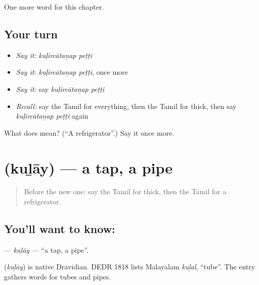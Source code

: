 \begin{grammarlens}[title={What you've built}]
One more word for this chapter.
\end{grammarlens}

\subsection*{Your turn}
\begin{itemize}
\raggedright
  \item \emph{Say it:} \emph{kuḷircātaṉap peṭṭi}
  \item \emph{Say it:} \emph{kuḷircātaṉap peṭṭi}, once more
  \item \emph{Say it:} say \emph{kuḷircātaṉap peṭṭi}
  \item \emph{Recall:} say the Tamil for everything, then the Tamil for thick, then say \emph{kuḷircātaṉap peṭṭi} again
\end{itemize}

\begin{tcolorbox}[breakable,colback=teal!4,colframe=teal!35!black,title={Before you move on}]
What does   mean? (\textquotedblleft{}A refrigerator\textquotedblright{}.) Say it once more.
\end{tcolorbox}
\section[\texorpdfstring{\ta{குழாய்} (kuḻāy)}{குழாய் (kuḻāy)}]{ (kuḻāy) — a tap, a pipe}

\label{lesson:TA-C182-kulay}



\begin{quote}
Before the new one: say the Tamil for thick, then the Tamil for a refrigerator.
\end{quote}

\subsection*{You'll want to know: }
\textbf{} — \emph{kuḻāy} — \textquotedblleft{}a tap, a pipe\textquotedblright{}.

\begin{cousinweb}
\textbf{} (\emph{kuḻāy}) is native Dravidian. DEDR 1818 lists Malayalam \emph{kuḻal}, \textquotedblleft{}tube\textquotedblright{}. The entry gathers words for tubes and pipes.
\end{cousinweb}

